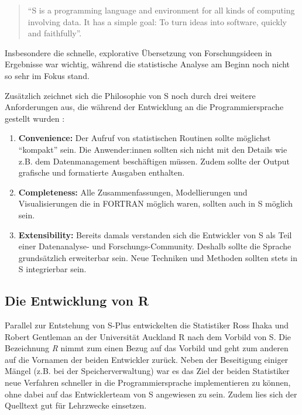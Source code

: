 \documentclass[
]{book}
\begin{document}
\begin{quote}
``S is a programming language and environment for all kinds of computing involving data. It has a simple goal: To turn ideas into software, quickly and faithfully''.
\end{quote}

Insbesondere die schnelle, explorative Übersetzung von Forschungsideen in Ergebnisse war wichtig, während die statistische Analyse am Beginn noch nicht so sehr im Fokus stand.

Zusätzlich zeichnet sich die Philosophie von S noch durch drei weitere Anforderungen aus, die
während der Entwicklung an die Programmiersprache gestellt wurden \citep[S. 84:5]{Chambers_2020}:

\begin{enumerate}
\def\labelenumi{\arabic{enumi}.}
\item
  \textbf{Convenience:} Der Aufruf von statistischen Routinen sollte möglichst ``kompakt'' sein. Die Anwender:innen sollten sich nicht mit den Details wie z.B. dem Datenmanagement beschäftigen müssen. Zudem sollte der Output grafische und formatierte Ausgaben enthalten.
\item
  \textbf{Completeness:} Alle Zusammenfassungen, Modellierungen und Visualisierungen die in FORTRAN möglich waren, sollten auch in S möglich sein.
\item
  \textbf{Extensibility:} Bereits damals verstanden sich die Entwickler von S als Teil einer Datenanalyse- und
  Forschungs-Community.
  Deshalb sollte die Sprache grundsätzlich erweiterbar sein. Neue Techniken und Methoden sollten stets in S integrierbar sein.
\end{enumerate}

\hypertarget{die-entwicklung-von-r}{%
\subsection{Die Entwicklung von R}\label{die-entwicklung-von-r}}

Parallel zur Entstehung von S-Plus entwickelten die Statistiker Ross Ihaka und Robert Gentleman
an der Universität Auckland R nach dem Vorbild von S. Die Bezeichnung \emph{R} nimmt zum einen Bezug auf das Vorbild und geht zum anderen auf die Vornamen der beiden Entwickler zurück.
Neben der Beseitigung einiger Mängel (z.B. bei der Speicherverwaltung) war es das Ziel der beiden Statistiker neue Verfahren schneller in die Programmiersprache implementieren zu können, ohne dabei auf das Entwicklerteam von S angewiesen zu sein.
Zudem lies sich der Quelltext gut für Lehrzwecke einsetzen.
\end{document}
